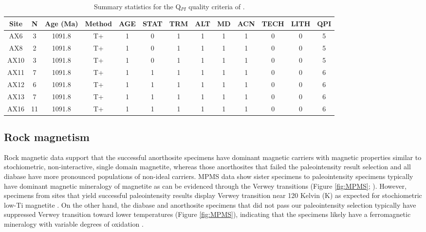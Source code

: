 \documentclass[draft]{agujournal2019}
\begin{document}
\begin{table}[]

\caption{\footnotesize{Summary statistics for the Q$_{PI}$ quality criteria of .}}
\centering
\begin{tabular}{ccccccccccccc}
\hline
Site & N  & Age (Ma) & Method & AGE & STAT & TRM & ALT & MD & ACN & TECH & LITH & QPI \\ \hline
AX6  & 3  & 1091.8   & T+     & 1   & 0    & 1   & 1   & 1  & 1   & 0    & 0    & 5   \\
AX8  & 2  & 1091.8   & T+     & 1   & 0    & 1   & 1   & 1  & 1   & 0    & 0    & 5   \\
AX10 & 3  & 1091.8   & T+     & 1   & 0    & 1   & 1   & 1  & 1   & 0    & 0    & 5   \\
AX11 & 7  & 1091.8   & T+     & 1   & 1    & 1   & 1   & 1  & 1   & 0    & 0    & 6   \\
AX12 & 6  & 1091.8   & T+     & 1   & 1    & 1   & 1   & 1  & 1   & 0    & 0    & 6   \\
AX13 & 7  & 1091.8   & T+     & 1   & 1    & 1   & 1   & 1  & 1   & 0    & 0    & 6   \\
AX16 & 11 & 1091.8   & T+     & 1   & 1    & 1   & 1   & 1  & 1   & 0    & 0    & 6   \\ \hline
\end{tabular}
\label{tab:QPI}
\end{table}

\subsection*{Rock magnetism}
Rock magnetic data support that the successful anorthosite specimens have dominant magnetic carriers with magnetic properties similar to stochiometric, non-interactive, single domain magnetite, whereas those anorthosites that failed the paleointensity result selection and all diabase have more pronounced populations of non-ideal carriers. MPMS data show sister specimens to paleointensity specimens typically have dominant magnetic mineralogy of magnetite as can be evidenced through the Verwey transitions (Figure \ref{fig:MPMS}; ). However, specimens from sites that yield successful paleointensity results display Verwey transition near 120 Kelvin (K) as expected for stochiometric low-Ti magnetite \cite{Ozdemir1993a}. On the other hand, the diabase and anorthosite specimens that did not pass our paleointensity selection typically have suppressed Verwey transition toward lower temperatures (Figure \ref{fig:MPMS}), indicating that the specimens likely have a ferromagnetic mineralogy with variable degrees of oxidation \cite{Ozdemir1993a}. 
 
\end{document}
